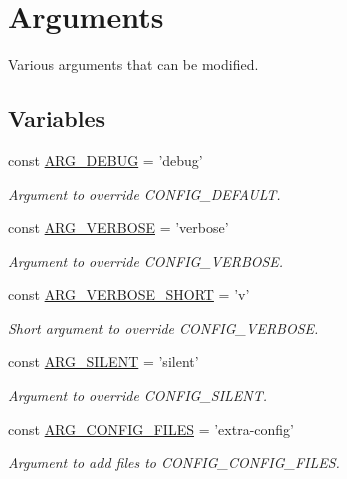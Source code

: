 \hypertarget{group__args}{\section{Arguments}
\label{group__args}
}


Various arguments that can be modified.  


\subsection*{Variables}
\begin{DoxyCompactItemize}
\item 
const \hyperlink{group__args_ga4c16b86b9d4656b8c7c6d27510566d77}{A\-R\-G\-\_\-\-D\-E\-B\-U\-G} = 'debug'
\begin{DoxyCompactList}\small\item\em Argument to override C\-O\-N\-F\-I\-G\-\_\-\-D\-E\-F\-A\-U\-L\-T. \end{DoxyCompactList}\item 
const \hyperlink{group__args_gac79062d79c803c74aee0337d9637f574}{A\-R\-G\-\_\-\-V\-E\-R\-B\-O\-S\-E} = 'verbose'
\begin{DoxyCompactList}\small\item\em Argument to override C\-O\-N\-F\-I\-G\-\_\-\-V\-E\-R\-B\-O\-S\-E. \end{DoxyCompactList}\item 
const \hyperlink{group__args_gab83df86552c8e9e5c2382a8948111235}{A\-R\-G\-\_\-\-V\-E\-R\-B\-O\-S\-E\-\_\-\-S\-H\-O\-R\-T} = 'v'
\begin{DoxyCompactList}\small\item\em Short argument to override C\-O\-N\-F\-I\-G\-\_\-\-V\-E\-R\-B\-O\-S\-E. \end{DoxyCompactList}\item 
const \hyperlink{group__args_gafd7c5af186098f8c54f92f6a0f5ff23c}{A\-R\-G\-\_\-\-S\-I\-L\-E\-N\-T} = 'silent'
\begin{DoxyCompactList}\small\item\em Argument to override C\-O\-N\-F\-I\-G\-\_\-\-S\-I\-L\-E\-N\-T. \end{DoxyCompactList}\item 
const \hyperlink{group__args_ga87849d19fd64c989a9562207edb3d6f5}{A\-R\-G\-\_\-\-C\-O\-N\-F\-I\-G\-\_\-\-F\-I\-L\-E\-S} = 'extra-\/config'
\begin{DoxyCompactList}\small\item\em Argument to add files to C\-O\-N\-F\-I\-G\-\_\-\-C\-O\-N\-F\-I\-G\-\_\-\-F\-I\-L\-E\-S. \end{DoxyCompactList}\item 

\end{DoxyCompactItemize}
